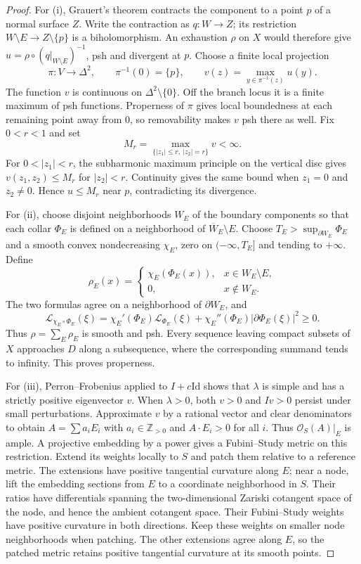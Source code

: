 \documentclass[11pt]{amsart}
\theoremstyle{definition}
\theoremstyle{remark}
\numberwithin{equation}{section}
\newcommand{\OO}{\mathcal O}
\newcommand{\Levi}{\mathcal L}
\begin{document}
\begin{proof}
For \textup{(i)}, Grauert's theorem
\cite[\S4, subsection~8(e)]{Grauert1962} contracts the component to
a point $p$ of a normal surface $Z$. Write the contraction as
$q:W\to Z$; its restriction $W\setminus E\to Z\setminus\{p\}$
is a biholomorphism. An exhaustion $\rho$ on $X$ would therefore give
$u=\rho\circ(q|_{W\setminus E})^{-1}$, psh and divergent at $p$.
Choose a finite local projection
\[
 \pi:V\longrightarrow\Delta^2,\qquad \pi^{-1}(0)=\{p\},
 \qquad v(z)=\max_{y\in\pi^{-1}(z)}u(y).
\]
The function $v$ is continuous on $\Delta^2\setminus\{0\}$.
Off the branch locus it is a finite maximum of psh functions.
Properness of $\pi$ gives local boundedness at each remaining point
away from $0$, so removability makes $v$ psh there as well.
Fix $0<r<1$ and set
\[
 M_r=\max_{\{|z_1|\le r,\ |z_2|=r\}}v<\infty.
\]
For $0<|z_1|<r$, the subharmonic maximum principle on the vertical
disc gives $v(z_1,z_2)\le M_r$ for $|z_2|<r$. Continuity gives the
same bound when $z_1=0$ and $z_2\ne0$. Hence $u\le M_r$ near $p$,
contradicting its divergence.

For \textup{(ii)}, choose disjoint neighborhoods $W_E$ of the
boundary components so that each collar $\Phi_E$ is defined on a
neighborhood of $\overline W_E\setminus E$.
Choose $T_E>\sup_{\partial W_E}\Phi_E$ and a smooth convex
nondecreasing $\chi_E$, zero on $(-\infty,T_E]$ and tending to
$+\infty$. Define
\[
 \rho_E(x)=
 \begin{cases}\chi_E(\Phi_E(x)),&x\in W_E\setminus E,\\
 0,&x\notin W_E.
 \end{cases}
\]
The two formulas agree on a neighborhood of $\partial W_E$, and
\[
 \Levi_{\chi_E\circ\Phi_E}(\xi)
 =\chi_E'(\Phi_E)\Levi_{\Phi_E}(\xi)
  +\chi_E''(\Phi_E)|\partial\Phi_E(\xi)|^2\ge0.
\]
Thus $\rho=\sum_E\rho_E$ is smooth and psh. Every sequence leaving
compact subsets of $X$ approaches $D$ along a subsequence, where the
corresponding summand tends to infinity. This proves properness.

For \textup{(iii)}, Perron--Frobenius applied to $I+c\mathrm{Id}$
shows that $\lambda$ is simple and has a strictly positive
eigenvector $v$. When $\lambda>0$, both $v>0$ and $Iv>0$ persist
under small perturbations. Approximate $v$ by a rational vector and
clear denominators to obtain
$A=\sum a_iE_i$ with $a_i\in\mathbb Z_{>0}$ and
$A\cdot E_i>0$ for all $i$.
Thus $\OO_S(A)|_E$ is ample. A projective embedding by a power
gives a Fubini--Study metric on this restriction. Extend its weights
locally to $S$ and patch them relative to a reference metric.
The extensions have positive tangential curvature along $E$;
near a node, lift the embedding sections from $E$ to a coordinate
neighborhood in $S$. Their ratios have differentials spanning the
two-dimensional Zariski cotangent space of the node, and hence the
ambient cotangent space. Their Fubini--Study weights have positive
curvature in both directions. Keep these weights on smaller node
neighborhoods when patching. The other extensions agree along $E$,
so the patched metric retains positive tangential curvature at its
smooth points.


\end{proof}
\end{document}
